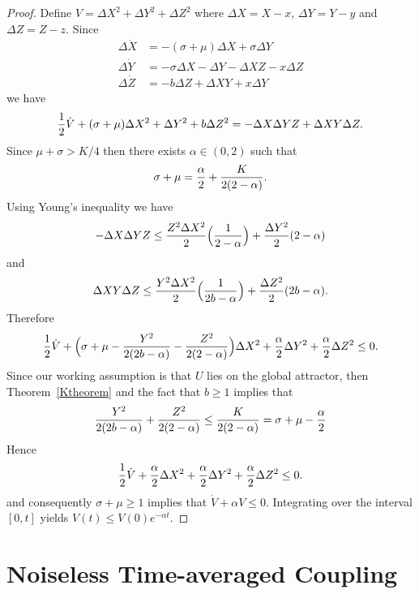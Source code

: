 \documentclass[master,tocprelim,12pt]{unrthesis}
\theoremstyle{definition}
\newcommand{\yourdelta}{{\Delta}}
\numberwithin{equation}{chapter}
\begin{document}
\begin{manuscript}
\begin{proof}
Define $V=\yourdelta X^2+\yourdelta Y^2+\yourdelta Z^2$ 
where $\yourdelta X=X-x$, $\yourdelta Y=Y-y$ and
$\yourdelta Z=Z-z$.
Since
\begin{align}
\label{NLIddotx}
    \yourdelta\dot{X} &= -(\sigma + \mu)\yourdelta X + \sigma\yourdelta Y\\
\label{NLIddoty}
    \yourdelta\dot{Y} &= -\sigma\yourdelta X - \yourdelta Y - \yourdelta XZ - x\yourdelta Z\\
\label{NLIddotz}
    \yourdelta\dot{Z} &= -b\yourdelta Z + \yourdelta X Y + x\yourdelta Y
\end{align}
we have
$$
{1\over 2}\dot{V} + (\sigma + \mu)\yourdelta X^2 + \yourdelta Y^2 + b\yourdelta Z^2 =
-\yourdelta X\yourdelta Y Z +\yourdelta X Y \yourdelta Z.
$$
Since $\mu+\sigma>K/4$ then there exists $\alpha\in (0,2)$
such that 
\begin{equation}\label{alphadef}
	\sigma + \mu = {\alpha\over 2}+{K\over 2(2-\alpha)}.
\end{equation}
Using Young's inequality we have 
$$
	-\yourdelta X\yourdelta Y Z\le
    \frac{Z^2\yourdelta X^2}{2}\Big({1\over 2-\alpha}\Big) 
		+  {\yourdelta Y^2\over 2} (2-\alpha)
$$
and
$$
	\yourdelta XY\yourdelta Z\le
    \frac{Y^2\yourdelta X^2}{2}\Big({1\over 2b-\alpha}\Big)
		+ {\yourdelta Z^2\over 2} (2b-\alpha).
$$
Therefore
$$
{1 \over 2}\dot{V} + \Big(\sigma + \mu 
	-{Y^2\over 2(2b-\alpha)}
	-{Z^2\over 2(2-\alpha)} 
\Big)\yourdelta X^2 + {\alpha\over 2}\yourdelta Y^2 + 
	{\alpha\over 2}\yourdelta Z^2 \le
    0.
$$
Since our working assumption is that $U$ lies on the global attractor,
then Theorem~\ref{Ktheorem} and the fact that $b\ge 1$ implies that
$$
{Y^2\over 2(2b-\alpha)}
+{Z^2\over 2(2-\alpha)}
	\le {K\over 2(2-\alpha)} = 
		\sigma+\mu-{\alpha\over 2}
$$
Hence 
$$
	{1 \over 2}\dot{V} + {\alpha\over 2}
		\yourdelta X^2 + {\alpha\over 2}\yourdelta Y^2 +
    {\alpha\over 2}\yourdelta Z^2 \le
    0.
$$
and consequently $\sigma+\mu\ge 1$ implies that
$\dot{V} + \alpha V \le 0$.
Integrating over the interval $[0,t]$ yields
$V(t) \leq  V(0)e^{-\alpha t} $.
\end{proof}

\section{Noiseless Time-averaged Coupling}\label{NLTACoupling}


\end{manuscript}
\end{document}
